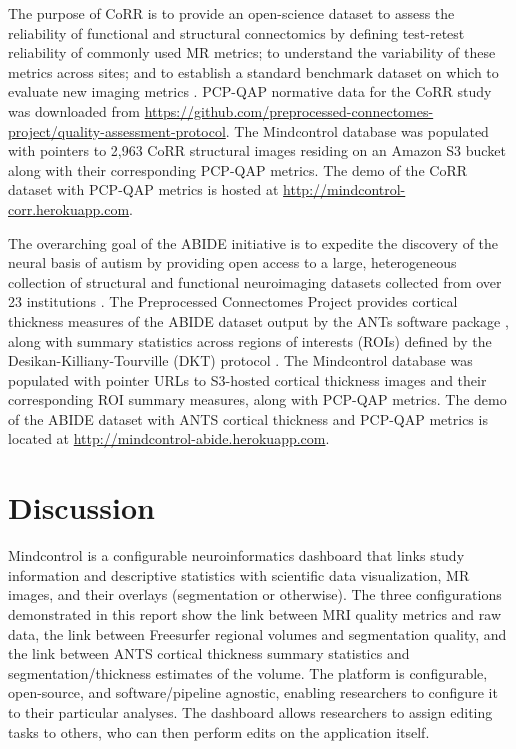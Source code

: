 The purpose of CoRR is to provide an open-science dataset to assess the reliability of functional and structural connectomics by defining test-retest reliability of commonly used MR metrics; to understand the variability of these metrics across sites; and to establish a standard benchmark dataset on which to evaluate new imaging metrics \cite{Zuo_2014}. PCP-QAP normative data for the CoRR study was downloaded from \href{http://raw.githubusercontent.com/preprocessed-connectomes-project/quality-assessment-protocol/master/poster_data/corr_anat.csv}{https://github.com/preprocessed-connectomes-project/quality-assessment-protocol}. The Mindcontrol database was populated with pointers to 2,963 CoRR structural images residing on an Amazon S3 bucket along with their corresponding PCP-QAP metrics. The demo of the CoRR dataset with PCP-QAP metrics is hosted at \url{http://mindcontrol-corr.herokuapp.com}. 

The overarching goal of the ABIDE initiative is to expedite the discovery of the neural basis of autism by providing open access to a large, heterogeneous collection of structural and functional neuroimaging datasets collected from over 23 institutions \cite{Di_Martino_2013}. The Preprocessed Connectomes Project provides cortical thickness measures of the ABIDE dataset output by the ANTs software package \cite{avants2009advanced}, along with summary statistics across regions of interests (ROIs) defined by the Desikan-Killiany-Tourville (DKT) protocol \cite{Klein_2012}. The Mindcontrol database was populated with pointer URLs to S3-hosted cortical thickness images and their corresponding ROI summary measures, along with PCP-QAP metrics. The demo of the ABIDE dataset with ANTS cortical thickness and PCP-QAP metrics is located at \url{http://mindcontrol-abide.herokuapp.com}.


\section{Discussion}

Mindcontrol is a configurable neuroinformatics dashboard that links study information and descriptive statistics with scientific data visualization, MR images, and their overlays (segmentation or otherwise). The three configurations demonstrated in this report show the link between MRI quality metrics and raw data, the link between Freesurfer regional volumes and segmentation quality, and the link between ANTS cortical thickness summary statistics and segmentation/thickness estimates of the volume. The platform is configurable, open-source, and software/pipeline agnostic, enabling researchers to configure it to their particular analyses. The dashboard allows researchers to assign editing tasks to others, who can then perform edits on the application itself. 

